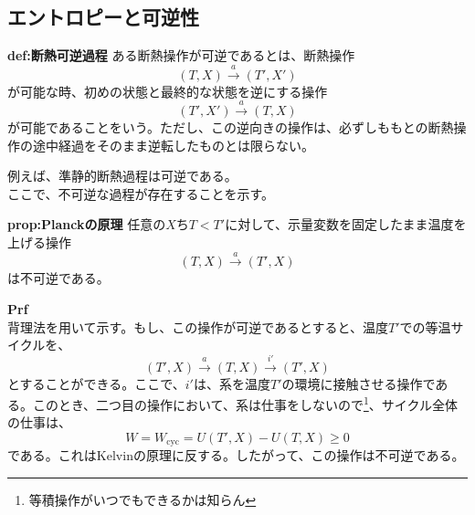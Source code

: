 \documentclass[a4paper,11pt]{jsarticle}
\begin{document}
\subsection{エントロピーと可逆性}
\begin{itembox}[l]{\textbf{def:断熱可逆過程}}
    ある断熱操作が可逆であるとは、断熱操作
    \begin{equation}
        (T,X) \xrightarrow{a} (T',X')
    \end{equation}
    が可能な時、初めの状態と最終的な状態を逆にする操作
    \begin{equation}
        (T',X') \xrightarrow{a} (T,X)
    \end{equation}
    が可能であることをいう。ただし、この逆向きの操作は、必ずしももとの断熱操作の途中経過をそのまま逆転したものとは限らない。
\end{itembox}
例えば、準静的断熱過程は可逆である。\\
ここで、不可逆な過程が存在することを示す。\\
\begin{itembox}[l]{\textbf{prop:Planckの原理}}
    任意の$X$ち$T<T'$に対して、示量変数を固定したまま温度を上げる操作
    \begin{equation}
        (T,X) \xrightarrow{a} (T',X)
    \end{equation}
    は不可逆である。
\end{itembox}
\textbf{Prf}\\
背理法を用いて示す。もし、この操作が可逆であるとすると、温度$T'$での等温サイクルを、
\begin{equation}
    (T',X) \xrightarrow{a} (T,X) \xrightarrow{i'} (T',X)
\end{equation}
とすることができる。ここで、$i'$は、系を温度$T'$の環境に接触させる操作である。このとき、二つ目の操作において、系は仕事をしないので\footnote{等積操作がいつでもできるかは知らん}、サイクル全体の仕事は、
\begin{equation}
    W = W_{\text{cyc}} = U(T',X) - U(T,X) \geq 0
\end{equation}
である。これはKelvinの原理に反する。したがって、この操作は不可逆である。\\
\end{document}
